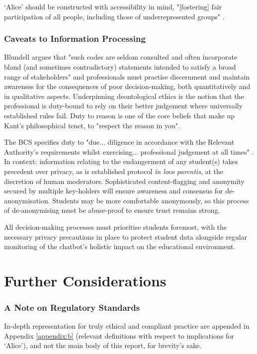 \documentclass[14pt,a4paper]{article}
\begin{document}
\begin{multicols}{2}
`Alice' should be constructed with accessibility in mind, "[fostering] fair participation of all people, including those of underrepresented groups" \textit{\parencite[p. 2]{ACM2024}}.

\subsubsection*{Caveats to Information Processing}
Blundell argues that "such codes are seldom consulted and often incorporate bland (and sometimes contradictory) statements intended to satisfy a broad range of stakeholders" \textit{\parencite[p. 40]{Blundell2020}} and professionals must practise discernment and maintain awareness for the consequences of poor decision-making, both quantitatively and in qualitative aspects.
Underpinning deontological ethics is the notion that the professional is duty-bound to rely on their better judgement where universally established rules fail.
Duty to reason is one of the core beliefs that make up Kant's philosophical tenet, to "respect the reason in you".

The BCS specifies duty to "due... diligence in accordance with the Relevant Authority's requirements whilst exercising... professional judgement at all times" \textit{\parencite[p. 2]{BCS2024}}.
In context: information relating to the endangerment of any student(s) takes precedent over privacy, as is established protocol \textit{in loco parentis}, at the discretion of human moderators.
Sophisticated content-flagging and anonymity secured by multiple key-holders will ensure awareness and consensus for de-anonymisation.
Students may be more comfortable anonymously, so this process of de-anonymising must be abuse-proof to ensure trust remains strong.

All decision-making processes must prioritise students foremost, with the necessary privacy precautions in place to protect student data alongside regular monitoring of the chatbot's holistic impact on the educational environment.

\section{Further Considerations}

\subsubsection*{A Note on Regulatory Standards}
In-depth representation for truly ethical and compliant practice are appended in Appendix \ref{appendix:b} (relevant definitions with respect to implications for `Alice'), and not the main body of this report, for brevity's sake.


\end{multicols}
\end{document}

